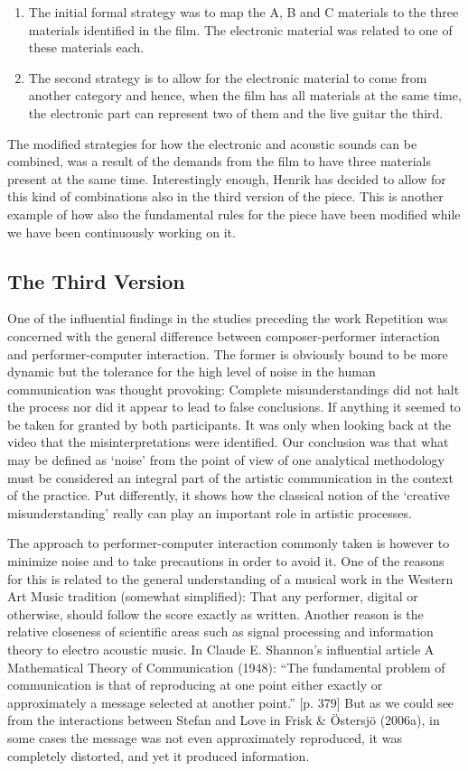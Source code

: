 \begin{enumerate}
\item The initial formal strategy was to map the A, B and C materials
  to the three materials identified in the film. The electronic
  material was related to one of these materials each.
\item The second strategy is to allow for the electronic material to
  come from another category and hence, when the film has all
  materials at the same time, the electronic part can represent two of
  them and the live guitar the third.
\end{enumerate}
The modified strategies for how the electronic and acoustic sounds can
be combined, was a result of the demands from the film to have three
materials present at the same time. Interestingly enough, Henrik has
decided to allow for this kind of combinations also in the third
version of the piece. This is another example of how also the
fundamental rules for the piece have been modified while we have been
continuously working on it.

\subsection{The Third Version }
\label{sec:third-version-}

One of the influential findings in the studies preceding the work
Repetition was concerned with the general difference between
composer-performer interaction and performer-computer interaction. The
former is obviously bound to be more dynamic but the tolerance for the
high level of noise in the human communication was thought provoking:
Complete misunderstandings did not halt the process nor did it appear
to lead to false conclusions. If anything it seemed to be taken for
granted by both participants. It was only when looking back at the
video that the misinterpretations were identified. Our conclusion was
that what may be defined as `noise' from the point of view of one
analytical methodology must be considered an integral part of the
artistic communication in the context of the practice. Put
differently, it shows how the classical notion of the `creative
misunderstanding' really can play an important role in artistic
processes.

The approach to performer-computer interaction commonly taken is
however to minimize noise and to take precautions in order to avoid
it. One of the reasons for this is related to the general
understanding of a musical work in the Western Art Music tradition
(somewhat simplified): That any performer, digital or otherwise,
should follow the score exactly as written. Another reason is the
relative closeness of scientific areas such as signal processing and
information theory to electro acoustic music. In Claude E. Shannon's
influential article A Mathematical Theory of Communication (1948):
``The fundamental problem of communication is that of reproducing at
one point either exactly or approximately a message selected at
another point.'' [p. 379] But as we could see from the interactions
between Stefan and Love in Frisk \& \"{O}stersj\"{o} (2006a), in some
cases the message was not even approximately reproduced, it was
completely distorted, and yet it produced information.

